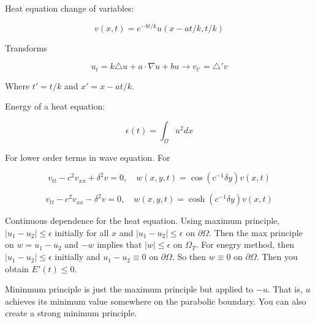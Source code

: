 \documentclass{article}
\newtheorem{one minute paper}[theorem]{One Minute Paper}
\begin{document}
Heat equation change of variables:

\begin{equation}
    v(x,t) = e^{-bt/k}u(x - at/k, t/k)
\end{equation}

Transforms 

\begin{equation}
    u_t = k\triangle u + a \cdot \nabla u + bu \rightarrow v_{t'} = \triangle' v
\end{equation}

Where $t' = t/k$ and $x' = x - at/k$.

Energy of a heat equation:

\begin{equation}
    \epsilon(t) = \int_{\Omega}u^2 dx
\end{equation}

For lower order terms in wave equation. For 

\begin{equation}
    v_{tt} - c^2v_{xx} + \delta^2 v = 0, \quad w(x,y,t) = \cos(c^{-1}\delta y)v(x,t)
\end{equation}


\begin{equation}
    v_{tt} - c^2v_{xx} - \delta^2 v = 0, \quad w(x,y,t) = \cosh(c^{-1}\delta y)v(x,t)
\end{equation}

Continuous dependence for the heat equation. Using maximum principle, $|u_1 - u_2| \leq \epsilon$ initially for all $x$ and $|u_1 - u_2| \leq \epsilon$ on $\partial \Omega$. Then the max principle on $w = u_1 - u_2$ and $-w$ implies that $|w| \leq \epsilon$ on $\Omega_T$. 
For enegry method, then $|u_1 - u_2| \leq \epsilon$ initially and $u_1 - u_2 \equiv 0$ on $\partial \Omega$. So then $w \equiv 0$ on $\partial \Omega$. Then you obtain $E'(t) \leq 0$. 

Mininmum principle is just the maximum principle but applied to $-u$. That is, $u$ achieves its minimum value somewhere on the parabolic boundary. You can also create a strong minimum principle.  
\end{document}
